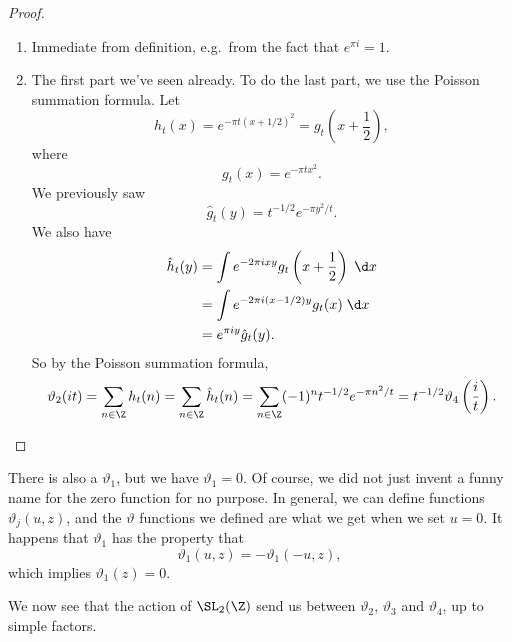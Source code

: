 \documentclass[a4paper]{article}
\begin{document}
\begin{proof}\leavevmode
  \begin{enumerate}
    \item Immediate from definition, e.g.\ from the fact that $e^{\pi i} = 1$.
    \item The first part we've seen already. To do the last part, we use the Poisson summation formula. Let
      \[
        h_t(x) = e^{-\pi t(x + 1/2)^2} = g_t\left(x + \frac{1}{2}\right),
      \]
      where
      \[
        g_t(x) = e^{-\pi tx^2}.
      \]
      We previously saw
      \[
        \hat{g}_t(y) = t^{-1/2} e^{-\pi y^2/t}.
      \]
      We also have
      \begin{align*}
        \hat{h}_t(y) &= \int e^{-2\pi i xy} g_t\left(x + \frac{1}{2}\right)\;\d x \\
        &= \int e^{-2\pi i (x - 1/2) y} g_t(x) \;\d x \\
        &= e^{\pi i y} \hat{g}_t(y).
      \end{align*}
      So by the Poisson summation formula,
      \[
        \vartheta_2(it) = \sum_{n \in \Z} h_t(n) = \sum_{n \in \Z} \hat{h}_t(n) = \sum_{n \in \Z} (-1)^n t^{-1/2} e^{-\pi n^2/t} = t^{-1/2} \vartheta_4 \left(\frac{i}{t}\right).
      \]
  \end{enumerate}
\end{proof}
There is also a $\vartheta_1$, but we have $\vartheta_1 = 0$. Of course, we did not just invent a funny name for the zero function for no purpose. In general, we can define functions $\vartheta_j(u, z)$, and the $\vartheta$ functions we defined are what we get when we set $u = 0$. It happens that $\vartheta_1$ has the property that
\[
  \vartheta_1(u, z) = - \vartheta_1(-u, z),
\]
which implies $\vartheta_1(z) = 0$.

We now see that the action of $\SL_2(\Z)$ send us between $\vartheta_2$, $\vartheta_3$ and $\vartheta_4$, up to simple factors.
\end{document}
